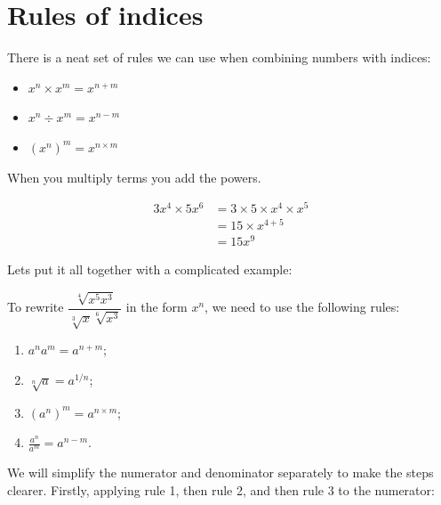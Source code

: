 \documentclass[
  a4paper,
]{scrbook}
\providecommand{\tightlist}{%
  \setlength{\itemsep}{0pt}\setlength{\parskip}{0pt}}
\begin{document}
\section{Rules of indices}\label{rules-of-indices}

There is a neat set of rules we can use when combining numbers with
indices:

\begin{tcolorbox}[enhanced jigsaw, arc=.35mm, bottomrule=.15mm, bottomtitle=1mm, breakable, colback=white, colbacktitle=quarto-callout-note-color!10!white, colframe=quarto-callout-note-color-frame, coltitle=black, left=2mm, leftrule=.75mm, opacityback=0, opacitybacktitle=0.6, rightrule=.15mm, title=\textcolor{quarto-callout-note-color}{\faInfo}\hspace{0.5em}{Note}, titlerule=0mm, toprule=.15mm, toptitle=1mm]

\begin{itemize}
\tightlist
\item
  \(x^n \times x^m = x^{n+m}\)
\item
  \(x^n \div x^m = x^{n-m}\)
\item
  \((x^n)^m = x^{n \times m}\)
\end{itemize}

\end{tcolorbox}

When you multiply terms you add the powers.

\[
\begin{aligned} 3x^4 \times 5x^6 &= 3 \times 5 \times x^4 \times x^5 \\
&= 15 \times x^{4+5} \\
&= 15x^9
\end{aligned}
\]

Lets put it all together with a complicated example:

To rewrite \(\dfrac{\sqrt[4]{x^5x^3}}{\sqrt[3]{x} \sqrt[6]{x^3}}\) in
the form \(x^n\), we need to use the following rules:

\begin{enumerate}
\def\labelenumi{\arabic{enumi}.}
\tightlist
\item
  \(a^n a^m = a^{n+m}\);
\item
  \(\sqrt[n]{a} = a^{1/n}\);
\item
  \(\left(a^n\right)^m = a^{n \times m}\);
\item
  \(\frac{a^n}{a^m} = a^{n-m}\).
\end{enumerate}

We will simplify the numerator and denominator separately to make the
steps clearer. Firstly, applying rule 1, then rule 2, and then rule 3 to
the numerator:
\end{document}
